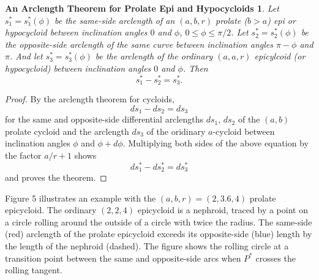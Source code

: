 \documentclass{ximera}
\newtheorem{theorem20}{An Arclength Theorem for Prolate Epi and Hypocycloids}
\begin{document}
\begin{theorem20}

Let $s_1^* = s_1^*(\phi)$ be the same-side arclength of an $(a,b,r)$ prolate ($b>a$) epi or hypocycloid between inclination angles $0$ and $\phi$, $0\leq \phi \leq \pi/2$. Let $s_2^* = s_2^*(\phi)$ be the opposite-side arclength of the same curve between inclination angles $\pi-\phi$ and $\pi$. And let $s_3^* = s_3^*(\phi)$ be the arclength of the ordinary $(a,a,r)$ epicylcoid (or hypocycloid) between inclination angles $0$ and $\phi$. Then
\[
       s_1^* - s_2^* = s_3^* .
\]



\end{theorem20}

\begin{proof}
By the arclength theorem for cycloids,
\[
    ds_1 - ds_2 = ds_3
\]
for the same and opposite-side differential arclengths $ds_1$, $ds_2$ of the $(a,b)$ prolate cycloid and the arclength $ds_3$ of the oridinary $a$-cycloid between inclination angles $\phi$ and $\phi + d\phi$. Multiplying both sides of the above equation by the factor $a/r + 1$ shows
\[
    ds_1^* - ds_2^* = ds_3^*
\]
and proves the theorem.
\end{proof}



Figure 5 illustrates an example with the $(a,b,r) = (2,3.6,4)$ prolate epicycloid. The ordinary $(2,2,4)$ epicycloid is a nephroid, traced by a point on a circle rolling around the outside of a circle with twice the radius. The same-side (red) arclength of the prolate epicycloid exceeds its opposite-side (blue) length by the length of the nephroid (dashed). The figure shows the rolling circle at a transition point between the same and opposite-side arcs when $P^*$ crosses the rolling tangent.

\begin{onlineOnly}
    \begin{center}
\end{center}
\end{onlineOnly}
\end{document}
